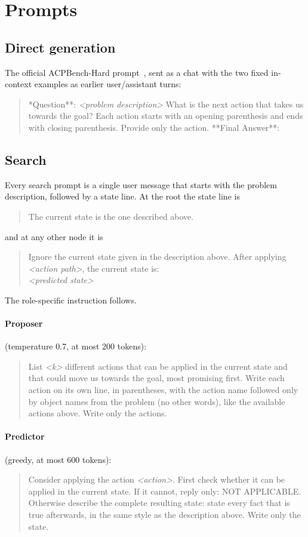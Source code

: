 \section{Prompts}
\label{app:prompts}

\newcommand{\promptbox}[1]{\begin{quote}\small\ttfamily #1\end{quote}}

\subsection{Direct generation}
The official ACPBench-Hard prompt~\citep{kokel2025acpbenchhard}, sent as a chat with the two fixed
in-context examples as earlier user/assistant turns:
\promptbox{**Question**: \textit{<problem description>} What is the next action that takes us
towards the goal? Each action starts with an opening parenthesis and ends with closing parenthesis.
Provide only the action. **Final Answer**:}

\subsection{Search}
Every search prompt is a single user message that starts with the problem description, followed by
a state line. At the root the state line is
\promptbox{The current state is the one described above.}
and at any other node it is
\promptbox{Ignore the current state given in the description above. After applying
\textit{<action path>}, the current state is:\\ \textit{<predicted state>}}
The role-specific instruction follows.

\paragraph{Proposer} (temperature 0.7, at most 200 tokens):
\promptbox{List \textit{<k>} different actions that can be applied in the current state and that
could move us towards the goal, most promising first. Write each action on its own line, in
parentheses, with the action name followed only by object names from the problem (no other words),
like the available actions above. Write only the actions.}

\paragraph{Predictor} (greedy, at most 600 tokens):
\promptbox{Consider applying the action \textit{<action>}. First check whether it can be applied in
the current state. If it cannot, reply only: NOT APPLICABLE. Otherwise describe the complete
resulting state: state every fact that is true afterwards, in the same style as the description
above. Write only the state.}

